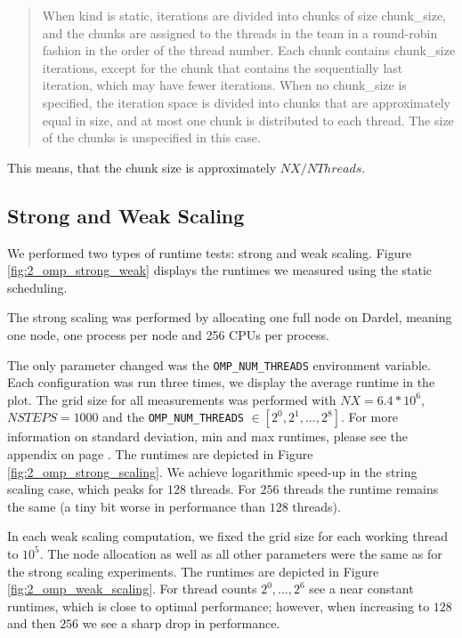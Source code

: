 \documentclass[a4paper,10pt]{article}
\begin{document}
\begin{multicols}{2}
\begin{quote}
When kind is static, iterations are divided into chunks of size chunk\_size, and the chunks are assigned to the threads in the team in a round-robin fashion in the order of the thread number. Each chunk contains chunk\_size iterations, except for the chunk that contains the sequentially last iteration, which may have fewer iterations.
When no chunk\_size is specified, the iteration space is divided into chunks that are approximately equal in size, and at most one chunk is distributed to each thread. The size of the chunks is unspecified in this case.
\end{quote}
This means, that the chunk size is approximately $NX / NThreads$.
\subsection{Strong and Weak Scaling}

We performed two types of runtime tests: strong and weak scaling.
Figure \ref{fig:2_omp_strong_weak} displays the runtimes we measured using the static scheduling.

The strong scaling was performed by allocating one full node on Dardel, meaning one node, one process per node
and 256 CPUs per process.

The only parameter changed was the \verb|OMP_NUM_THREADS| environment variable.
Each configuration was run three times, we display the average runtime in the plot.
The grid size for all measurements was performed with $NX = 6.4 * 10^6$, $NSTEPS = 1000$ and the \verb|OMP_NUM_THREADS| $\in [2^0, 2^1, ..., 2^8]$.
For more information on standard deviation, min and max runtimes, please see the appendix on page \pageref{sec:app:statistics}.
The runtimes are depicted in Figure \ref{fig:2_omp_strong_scaling}.
We achieve logarithmic speed-up in the string scaling case, which peaks for $128$ threads.
For $256$ threads the runtime remains the same (a tiny bit worse in performance than $128$ threads).

In each weak scaling computation, we fixed the grid size for each working thread to $10^5$.
The node allocation as well as all other parameters were the same as for the strong scaling experiments.
The runtimes are depicted in Figure \ref{fig:2_omp_weak_scaling}.
For thread counts $2^0, ..., 2^6$ see a near constant runtimes, which is close to optimal performance; however, when increasing to $128$ and then $256$ we see a sharp drop in performance.


\end{multicols}
\end{document}
